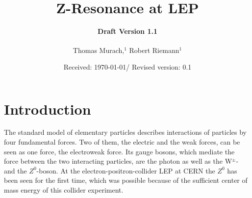 \documentclass[epj,nopacs]{svjour}
\begin{document}
\hugehead

\newcommand{\dd}[1]{\mathrm{d}#1\,} %
\newcommand{\lref}[1]{listing~(\ref{lst:#1})} %
\newcommand{\fref}[1]{fig.~(\ref{fig:#1})} %
\newcommand{\tref}[1]{tab.~(\ref{tab:#1})} %
\newcommand{\eref}[1]{eq.~(\ref{eqn:#1})} %

\title{Z-Resonance at LEP}
\author{{\bf Draft Version 1.1}\\
\medskip \\
Thomas Murach,$^{1}$
Robert Riemann$^{1}$
} 
\date{Received: \today / Revised version: 0.1}

\maketitle

\vspace*{-1.5cm}
\section{ Introduction}
\baselineskip=0.38cm
\vspace*{1.cm}

The standard model of elementary particles describes interactions of particles
by four fundamental forces. Two of them, the electric and the weak forces, can
be seen as one force, the electroweak force. Its gauge
bosons, which mediate the force between the two interacting particles, are the
photon as well as the W$^{\pm}$- and the $Z^0$-boson. At the
electron-positron-collider LEP at CERN the $Z^0$ has been seen for the first
time, which was possible because of the sufficient center of mass energy of this
collider experiment.
\end{document}
